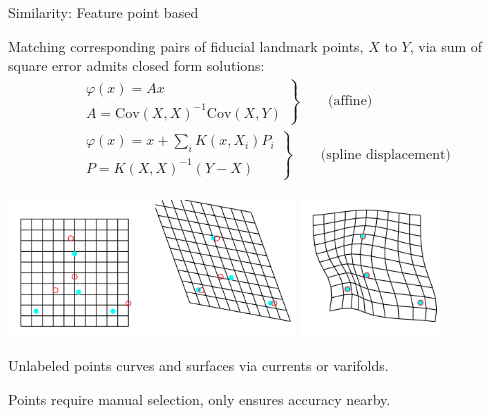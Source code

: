 \documentclass{beamer}
\begin{document}
\begin{frame}{Similarity: Feature point based}

Matching corresponding pairs of fiducial landmark points, {\color{cyan}$X$} to {\color{red}$Y$}, via sum of square error admits closed form solutions:
\begin{align*}
&\left.
\begin{array}{l}
\varphi(x) = Ax\\
 A = \text{Cov}(X,X)^{-1}\text{Cov}(X,Y)
\end{array}
\right\} \qquad  \text{(affine)}\\
&\left. 
\begin{array}{l}
\varphi(x) = x + \sum_i K(x,X_i) P_i\\
P = K(X,X)^{-1}(Y-X)
\end{array}
\right \} \qquad  \text{(spline displacement)}
\end{align*}
\begin{center}
\includegraphics[width=0.28\textwidth]{landmarks0}
\includegraphics[width=0.28\textwidth]{landmarks2}
\includegraphics[width=0.28\textwidth]{landmarks3}
\end{center}
\vspace{-1.5em}
\vspace{1em}

Unlabeled points curves and surfaces via currents or varifolds.

\vspace{1em}
Points require manual selection, only ensures accuracy nearby.



\end{frame}
\end{document}
